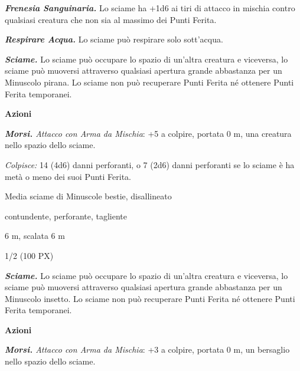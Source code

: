 \begin{multicols}{2}
{\emph{\textbf{Frenesia Sanguinaria.}} Lo sciame ha +1d6 ai tiri di attacco in mischia contro qualsiasi creatura che non sia al massimo dei Punti Ferita.

\emph{\textbf{Respirare Acqua.}} Lo sciame può respirare solo sott'acqua.

\emph{\textbf{Sciame.}} Lo sciame può occupare lo spazio di un'altra creatura e viceversa, lo sciame può muoversi attraverso qualsiasi apertura grande abbastanza per un Minuscolo pirana. Lo sciame non può recuperare Punti Ferita né ottenere Punti Ferita temporanei.

\textbf{Azioni}

\emph{\textbf{Morsi.} Attacco con Arma da Mischia}: +5 a colpire, portata 0 m, una creatura nello spazio dello sciame.

\emph{Colpisce:} 14 (4d6) danni perforanti, o 7 (2d6) danni perforanti se lo sciame è ha metà o meno dei suoi Punti Ferita.

\begin{description}[noitemsep, topsep=0pt, parsep=0pt, partopsep=0pt, itemsep=1pt, leftmargin=2.35cm,  labelwidth=2.2cm, itemindent=0cm, listparindent=0pt] %
\setlength{\baselineskip}{10pt}
\item[\textbf{Taglia/Tipo}] Media sciame di Minuscole bestie, disallineato
\item[\textbf{Caratt.}] 
\item[\textbf{Punti Ferita}] 
\item[\textbf{Resistenze al danno}] contundente, perforante, tagliente
\item[\textbf{Tiri Salvez.}] 
\item[\textbf{Movimento}] 6 m, scalata 6 m
\item[\textbf{Sfida}] 1/2 (100 PX)
\end{description}
\smallskip

\emph{\textbf{Sciame.}} Lo sciame può occupare lo spazio di un'altra creatura e viceversa, lo sciame può muoversi attraverso qualsiasi apertura grande abbastanza per un Minuscolo insetto. Lo sciame non può recuperare Punti Ferita né ottenere Punti Ferita temporanei.

\textbf{Azioni}

\emph{\textbf{Morsi.} Attacco con Arma da Mischia}: +3 a colpire, portata 0 m, un bersaglio nello spazio dello sciame.

}
\end{multicols}
